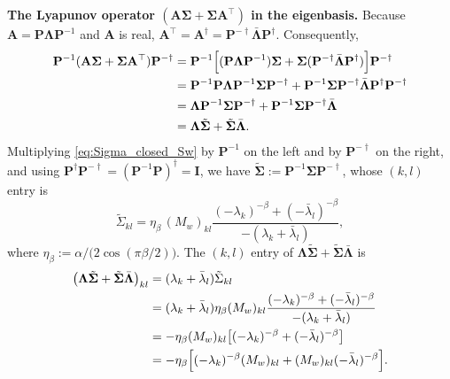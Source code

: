 \documentclass[12pt]{article}
\begin{document}
\textbf{The Lyapunov operator $(\mathbf A\boldsymbol\Sigma+\boldsymbol\Sigma\mathbf A^\top)$ in the eigenbasis.}
Because $\mathbf A=\mathbf P\boldsymbol\Lambda\mathbf P^{-1}$ and $\mathbf A$ is real,
$\mathbf A^\top=\mathbf A^\dagger=\mathbf P^{-\dagger}\bar{\boldsymbol\Lambda}\mathbf P^\dagger$.
Consequently,
\begin{equation}
\begin{aligned}
    \mathbf P^{-1}(\mathbf A\boldsymbol\Sigma+\boldsymbol\Sigma\mathbf A^\top)\mathbf P^{-\dagger}
    &=\mathbf P^{-1}\Bigl[(\mathbf P\boldsymbol\Lambda\mathbf P^{-1})\boldsymbol\Sigma
      +\boldsymbol\Sigma(\mathbf P^{-\dagger}\bar{\boldsymbol\Lambda}\mathbf P^\dagger)\Bigr]\mathbf P^{-\dagger}\\
    &=\mathbf P^{-1}\mathbf P\boldsymbol\Lambda\mathbf P^{-1}\boldsymbol\Sigma\mathbf P^{-\dagger}
      +\mathbf P^{-1}\boldsymbol\Sigma\mathbf P^{-\dagger}\bar{\boldsymbol\Lambda}\mathbf P^\dagger\mathbf P^{-\dagger}\\
    &=\boldsymbol\Lambda\mathbf P^{-1}\boldsymbol\Sigma\mathbf P^{-\dagger}
      +\mathbf P^{-1}\boldsymbol\Sigma\mathbf P^{-\dagger}\bar{\boldsymbol\Lambda}\\
    &=\boldsymbol\Lambda\tilde{\boldsymbol\Sigma}
      +\tilde{\boldsymbol\Sigma}\bar{\boldsymbol\Lambda}.
\end{aligned}
    \label{eq:lyap_transform_eigenbasis}
\end{equation}
Multiplying \eqref{eq:Sigma_closed_Sw} by $\mathbf{P}^{-1}$ on the left and by $\mathbf{P}^{-\dagger}$ on the right, and using
$\mathbf{P}^{\dagger}\mathbf{P}^{-\dagger}=(\mathbf{P}^{-1}\mathbf{P})^{\dagger}=\mathbf{I}$, we have
$\tilde{\boldsymbol{\Sigma}}:=\mathbf{P}^{-1}\boldsymbol{\Sigma}\mathbf{P}^{-\dagger}$, whose $(k,l)$ entry is
\begin{equation}
    \tilde\Sigma_{kl}=\eta_\beta\,(M_w)_{kl}
    \frac{(-\lambda_k)^{-\beta}+(-\bar\lambda_l)^{-\beta}}
    {-(\lambda_k+\bar\lambda_l)},
    \label{eq:Sigma_tilde_entries}
\end{equation}
where $\eta_\beta:=\alpha/\bigl(2\cos(\pi\beta/2)\bigr)$.
The $(k,l)$ entry of $\boldsymbol\Lambda\tilde{\boldsymbol\Sigma}
+\tilde{\boldsymbol\Sigma}\bar{\boldsymbol\Lambda}$ is
\begin{equation}
\begin{aligned}
    \bigl(\boldsymbol\Lambda\tilde{\boldsymbol\Sigma}
      +\tilde{\boldsymbol\Sigma}\bar{\boldsymbol\Lambda}\bigr)_{kl}
    &=(\lambda_k+\bar\lambda_l)\tilde\Sigma_{kl}\\
    &=(\lambda_k+\bar\lambda_l)\eta_\beta(M_w)_{kl}
      \frac{(-\lambda_k)^{-\beta}+(-\bar\lambda_l)^{-\beta}}
      {-(\lambda_k+\bar\lambda_l)}\\
    &=-\eta_\beta(M_w)_{kl}
      \bigl[(-\lambda_k)^{-\beta}+(-\bar\lambda_l)^{-\beta}\bigr]\\
    &=-\eta_\beta\Bigl[
      (-\lambda_k)^{-\beta}(M_w)_{kl}
      +(M_w)_{kl}(-\bar\lambda_l)^{-\beta}\Bigr].
\end{aligned}
    \label{eq:lyap_entrywise}
\end{equation}
\end{document}
